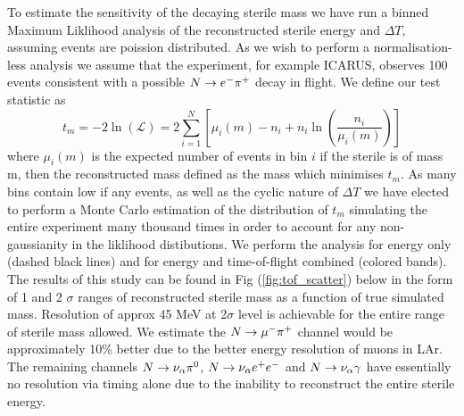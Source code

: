 \documentclass[11pt, a4paper]{article}
\def\ster{\ensuremath N}
\begin{document}
To estimate the sensitivity of the decaying sterile mass we have run a binned Maximum Liklihood analysis of the reconstructed sterile energy and $\Delta T$, assuming events are poission distributed. As we wish to perform a normalisation-less analysis we assume that the experiment, for example ICARUS, observes 100 events consistent with a possible $\ster\rightarrow e^- \pi^+$ decay in flight. We define our test statistic as \cite{Agashe:2014kda}
\[
	t_m = -2 \ln \left(\mathcal{L}\right) =  2 \sum_{i=1}^N \left[ \mu_i(m)-n_i +n_i \ln(\frac{n_i}{\mu_i(m)})  \right]
\]
where $\mu_i(m)$ is the expected number of events in bin $i$ if the sterile is of mass m, then the reconstructed mass defined as the mass which minimises $t_m$. As many bins contain low if any events, as well as the cyclic nature of $\Delta T$ we have elected to perform a Monte Carlo estimation of the distribution of $t_m$ simulating the entire experiment many thousand times in order to account for any non-gaussianity in the liklihood distibutions. We perform the analysis for energy only (dashed black lines) and for energy and time-of-flight combined (colored bands). The results of this study can be found in Fig (\ref{fig:tof_scatter}) below in the form of 1 and 2 $\sigma$ ranges of reconstructed sterile mass as a function of true simulated mass. Resolution of approx 45 MeV at 2$\sigma$ level is achievable for the entire range of sterile mass allowed. We estimate the $\ster\rightarrow \mu^- \pi^+$ channel would be approximately 10\% better due to the better energy resolution of muons in LAr. The remaining channels $\ster \rightarrow \nu_\alpha \pi^0$, $\ster\rightarrow \nu_\alpha e^+ e^-$ and $\ster \rightarrow \nu_\alpha \gamma$ have essentially no resolution via timing alone due to the inability to reconstruct the entire sterile energy.
\end{document}
